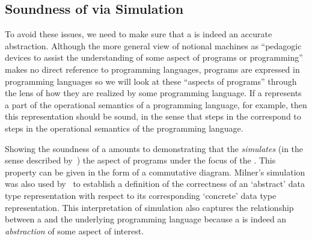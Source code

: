 {%
\subsection{Soundness of \NMs{} via Simulation}
To avoid
these issues,
we need to make sure that a \nm{} 
is indeed an accurate abstraction.
%
Although
the more general view of
notional machines
as ``pedagogic devices to assist the understanding of some aspect of programs or programming''~\citep{fincherNotionalMachinesComputing2020}
makes no direct reference to programming languages,
programs are expressed in programming languages
so we will look at these ``aspects of programs''
through the lens of how they are realized by some programming language.
%
If a \nm{}
represents
a part of the operational semantics of a programming language,
for example,
then
this
representation
should be sound, in the sense that
steps in the \nm{}
correspond to steps in the operational semantics of the programming language.


Showing the soundness of a \nm{}
amounts to demonstrating that
the \nm{} \emph{simulates}
(in the sense described by~\citet{milnerAlgebraicDefinitionSimulation1971})
the aspect of programs under the focus of the \nm{}.
%
This property can be given in the form of a commutative diagram.
%
Milner's simulation was also used
by~\citet{hoareProofCorrectnessData1972}
to establish a definition of
the correctness of
an `abstract' data type representation
with respect to
its corresponding `concrete' data type representation.
%
This interpretation of simulation
also captures the relationship between a \nm{} and the underlying programming language
because
a \nm{} is indeed an \emph{abstraction} of some aspect of interest.


}
